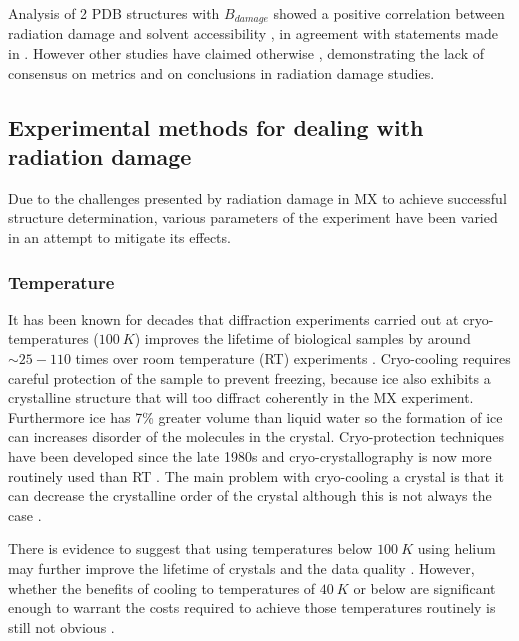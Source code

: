         Analysis of 2 PDB structures with $B_{damage}$ showed a positive correlation between radiation damage and solvent accessibility \cite{gerstel2015identifying}, in agreement with statements made in \cite{sygusch1988}.
		However other studies have claimed otherwise \cite{coquelle2007activity,homer2011energy}, demonstrating the lack of consensus on metrics and on conclusions in radiation damage studies.

    \subsection{Experimental methods for dealing with radiation damage}
    \label{sub:Experimental methods for dealing with radiation damage}
        Due to the challenges presented by radiation damage in MX to achieve successful structure determination, various parameters of the experiment have been varied in an attempt to mitigate its effects.

        \subsubsection{Temperature}
        \label{subs:Temperature}
            It has been known for decades that diffraction experiments carried out at cryo-temperatures ($100\ K$) improves the lifetime of biological samples \cite{haas1970crystallographic,henderson1990cryo,brooks2015nobel} by around $\sim 25 - 110$ times over room temperature (RT) experiments \cite{south2007}.
            Cryo-cooling requires careful protection of the sample to prevent freezing, because ice also exhibits a crystalline structure that will too diffract coherently in the MX experiment.
            Furthermore ice has 7\% greater volume than liquid water so the formation of ice can increases disorder of the molecules in the crystal.
            Cryo-protection techniques have been developed since the late 1980s \cite{garman1997macromolecular,hope1988cryocrystallography,teng1990mounting} and cryo-crystallography is now more routinely used than RT \cite{garman2014}.
            The main problem with cryo-cooling a crystal is that it can decrease the crystalline order of the crystal \cite{nave2005} although this is not always the case \cite{garman1999cool}.

            There is evidence to suggest that using temperatures below $100\ K$ using helium may further improve the lifetime of crystals and the data quality \cite{meents2010,teng2002}.
            However, whether the benefits of cooling to temperatures of $40\ K$ or below are significant enough to warrant the costs required to achieve those temperatures routinely is still not obvious \cite{weik2010temperature}.

